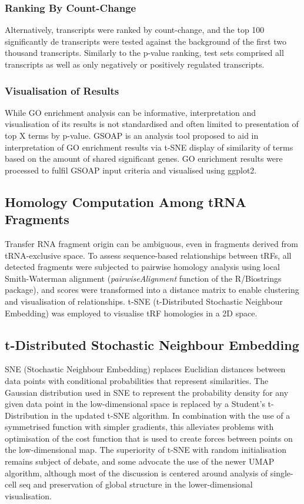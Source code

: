 \begin{method}
\subsubsection{Ranking By Count-Change}
Alternatively, transcripts were ranked by count-change, and the top 100 significantly \ac{de} transcripts were tested against the background of the first two thousand transcripts. Similarly to the p-value ranking, test sets comprised all transcripts as well as only negatively or positively regulated transcripts.

\subsubsection{Visualisation of Results}
While GO enrichment analysis can be informative, interpretation and visualisation of its results is not standardised and often limited to presentation of top X terms by p-value. GSOAP\cite{Tokar2020} is an analysis tool proposed to aid in interpretation of GO enrichment results via t-SNE display of similarity of terms based on the amount of shared significant genes. GO enrichment results were processed to fulfil GSOAP input criteria and visualised using ggplot2.\cite{Wickham2016}

\subsection{Homology Computation Among tRNA Fragments}
Transfer RNA fragment origin can be ambiguous, even in fragments derived from tRNA-exclusive space. To assess sequence-based relationships between tRFs, all detected fragments were subjected to pairwise homology analysis using local Smith-Waterman alignment (\emph{pairwiseAlignment} function of the R/Biostrings package), and scores were transformed into a distance matrix to enable clustering and visualisation of relationships. t-SNE (t-Distributed Stochastic Neighbour Embedding) was employed to visualise tRF homologies in a 2D space.

\subsection{t-Distributed Stochastic Neighbour Embedding} \label{sec:stroke:tsne}
SNE (Stochastic Neighbour Embedding) replaces Euclidian distances between data points with conditional probabilities that represent similarities. The Gaussian distribution used in SNE to represent the probability density for any given data point in the low-dimensional space is replaced by a Student's t-Distribution in the updated t-SNE algorithm. In combination with the use of a symmetrised function with simpler gradients, this alleviates problems with optimisation of the cost function that is used to create forces between points on the low-dimensional map.\cite{Maaten2008} The superiority of t-SNE with random initialisation remains subject of debate, and some advocate the use of the newer UMAP algorithm\cite{McInnes2018}, although most of the discussion is centered around analysis of single-cell \ac{seq} and preservation of global structure in the lower-dimensional visualisation.\cite{Becht2019}


\end{method}
